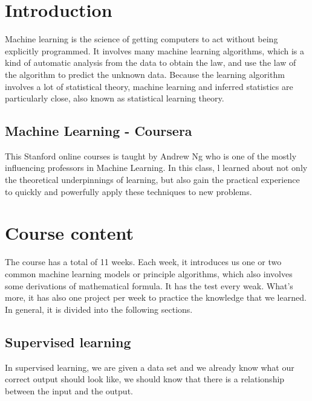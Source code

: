 \documentclass[a4paper]{article}
\begin{document}
\section{Introduction}
\Large{
	Machine learning is the science of getting computers to act without being explicitly programmed. It involves many machine learning algorithms, which is a kind of automatic analysis from the data to obtain the law, and use the law of the algorithm to predict the unknown data. Because the learning algorithm involves a lot of statistical theory, machine learning and inferred statistics are particularly close, also known as statistical learning theory.
\subsection{Machine Learning - Coursera}
This Stanford online courses is taught by Andrew Ng who is one of the mostly influencing professors in Machine Learning. In this class, l learned about not only the theoretical underpinnings of learning, but also gain the practical experience to quickly and powerfully apply these techniques to new problems. 


\section{Course content}
The course has a total of 11 weeks. Each week, it introduces us one or two common machine learning models or principle algorithms, which also involves some derivations of mathematical formula. It has the test every weak. What's more, it has also one project per week to practice the knowledge that we learned. In general, it is divided into the following sections.
\subsection{Supervised learning}
In supervised learning, we are given a data set and we already know what our correct output should look like, we should know that there is a relationship between the input and the output.\\
}
\end{document}
